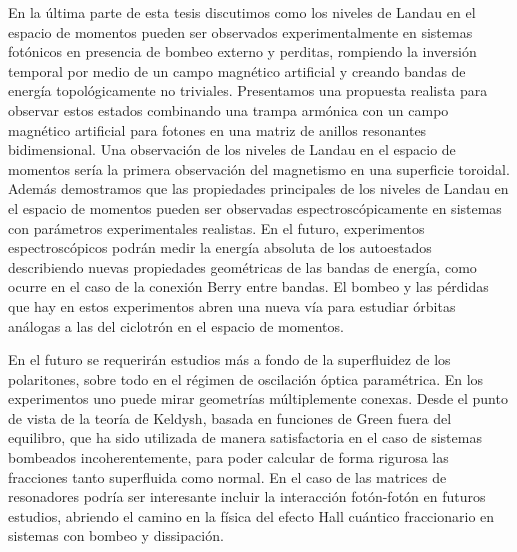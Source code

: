 En la \'ultima parte de esta tesis discutimos como los niveles de
Landau en el espacio de momentos pueden ser observados
experimentalmente en sistemas fot\'onicos en presencia de bombeo
externo y perditas, rompiendo la inversi\'on temporal por medio de un
campo magn\'etico artificial y creando bandas de energ\'ia
topol\'ogicamente no triviales. Presentamos una propuesta realista
para observar estos estados combinando una trampa arm\'onica con un
campo magn\'etico artificial para fotones en una matriz de anillos
resonantes bidimensional. Una observaci\'on de los niveles de Landau
en el espacio de momentos ser\'ia la primera observaci\'on del
magnetismo en una superficie toroidal. Adem\'as demostramos que las
propiedades principales de los niveles de Landau en el espacio de
momentos pueden ser observadas espectrosc\'opicamente en sistemas con
par\'ametros experimentales realistas. En el futuro, experimentos
espectrosc\'opicos podr\'an medir la energ\'ia absoluta de los
autoestados describiendo nuevas propiedades geom\'etricas de las
bandas de energ\'ia, como ocurre en el caso de la conexi\'on Berry
entre bandas. El bombeo y las p\'erdidas que hay en estos experimentos
abren una nueva v\'ia para estudiar \'orbitas an\'alogas a las del
ciclotr\'on en el espacio de momentos.

En el futuro se requerir\'an estudios m\'as a fondo de la superfluidez
de los polaritones, sobre todo en el r\'egimen de oscilaci\'on
\'optica param\'etrica. En los experimentos uno puede mirar
geometr\'ias m\'ultiplemente conexas. Desde el punto de vista de la
teor\'ia de Keldysh, basada en funciones de Green fuera del equilibro,
que ha sido utilizada de manera satisfactoria en el caso de sistemas
bombeados incoherentemente, para poder calcular de forma rigurosa las
fracciones tanto superfluida como normal. En el caso de las matrices
de resonadores podr\'ia ser interesante incluir la interacci\'on
fot\'on-fot\'on en futuros estudios, abriendo el camino en la f\'isica
del efecto Hall cu\'antico fraccionario en sistemas con bombeo y
dissipaci\'on.



